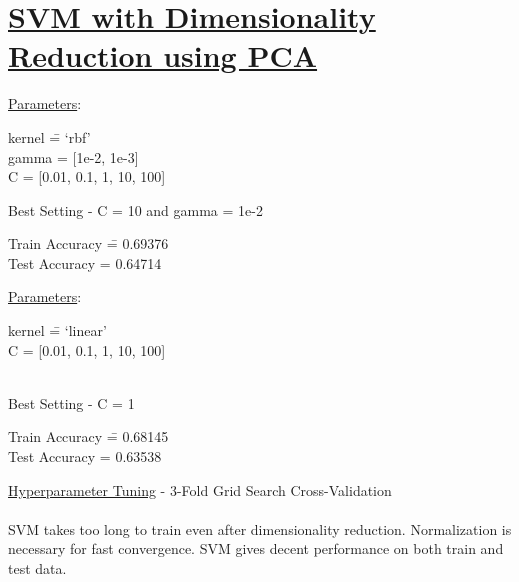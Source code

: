 \documentclass[12pt]{article}
\begin{document}
\section*{\underline{SVM with Dimensionality Reduction using PCA}}
\begin{addmargin}[0.3in]{0in}
\begin{multicols}{2}
\underline{Parameters}:
\begin{tabbing}
    kernel \quad \= = `rbf' \\
    gamma \> = [1e-2, 1e-3] \\
    C \> = [0.01, 0.1, 1, 10, 100] \\
\end{tabbing}
Best Setting - C = 10 and gamma = 1e-2 \\
\begin{tabbing}
    Train Accuracy \= = 0.69376 \\
    Test Accuracy \> = 0.64714 \\
\end{tabbing}
\underline{Parameters}:
\begin{tabbing}
    kernel \quad \= = `linear' \\
    C \> = [0.01, 0.1, 1, 10, 100] \\ \\
\end{tabbing}
Best Setting - C = 1 \\
\begin{tabbing}
    Train Accuracy \= = 0.68145 \\
    Test Accuracy \> = 0.63538 \\
\end{tabbing}
\end{multicols}
\end{addmargin}
\begin{addmargin}[0.3in]{0in}
\underline{Hyperparameter Tuning} - 3-Fold Grid Search Cross-Validation \\ \\
SVM takes too long to train even after dimensionality reduction. Normalization is necessary for fast convergence. SVM gives decent performance on both train and test data.
\end{addmargin}
\end{document}
